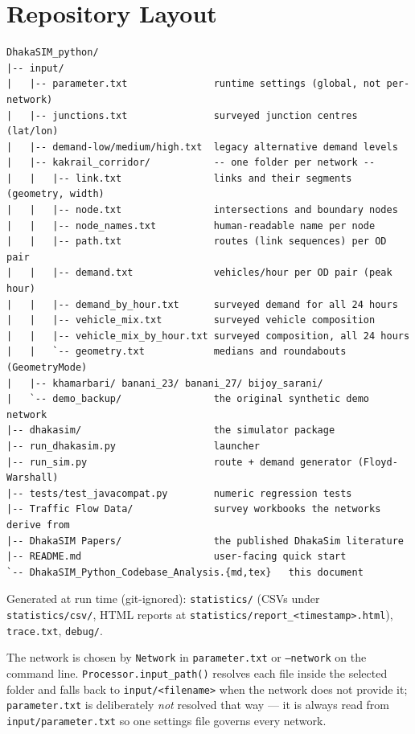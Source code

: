 \documentclass[11pt, a4paper]{article}
\newcommand{\code}[1]{\texttt{#1}}
\begin{document}
\section{Repository Layout}

\begin{lstlisting}[caption=Repository layout]
DhakaSIM_python/
|-- input/
|   |-- parameter.txt               runtime settings (global, not per-network)
|   |-- junctions.txt               surveyed junction centres (lat/lon)
|   |-- demand-low/medium/high.txt  legacy alternative demand levels
|   |-- kakrail_corridor/           -- one folder per network --
|   |   |-- link.txt                links and their segments (geometry, width)
|   |   |-- node.txt                intersections and boundary nodes
|   |   |-- node_names.txt          human-readable name per node
|   |   |-- path.txt                routes (link sequences) per OD pair
|   |   |-- demand.txt              vehicles/hour per OD pair (peak hour)
|   |   |-- demand_by_hour.txt      surveyed demand for all 24 hours
|   |   |-- vehicle_mix.txt         surveyed vehicle composition
|   |   |-- vehicle_mix_by_hour.txt surveyed composition, all 24 hours
|   |   `-- geometry.txt            medians and roundabouts (GeometryMode)
|   |-- khamarbari/ banani_23/ banani_27/ bijoy_sarani/
|   `-- demo_backup/                the original synthetic demo network
|-- dhakasim/                       the simulator package
|-- run_dhakasim.py                 launcher
|-- run_sim.py                      route + demand generator (Floyd-Warshall)
|-- tests/test_javacompat.py        numeric regression tests
|-- Traffic Flow Data/              survey workbooks the networks derive from
|-- DhakaSIM Papers/                the published DhakaSim literature
|-- README.md                       user-facing quick start
`-- DhakaSIM_Python_Codebase_Analysis.{md,tex}   this document
\end{lstlisting}

Generated at run time (git-ignored): \code{statistics/} (CSVs under
\code{statistics/csv/}, HTML reports at
\code{statistics/report\_<timestamp>.html}), \code{trace.txt}, \code{debug/}.

The network is chosen by \code{Network} in \code{parameter.txt} or
\code{--network} on the command line. \code{Processor.input\_path()} resolves
each file inside the selected folder and falls back to \code{input/<filename>}
when the network does not provide it; \code{parameter.txt} is deliberately
\emph{not} resolved that way --- it is always read from
\code{input/parameter.txt} so one settings file governs every network.
\end{document}
